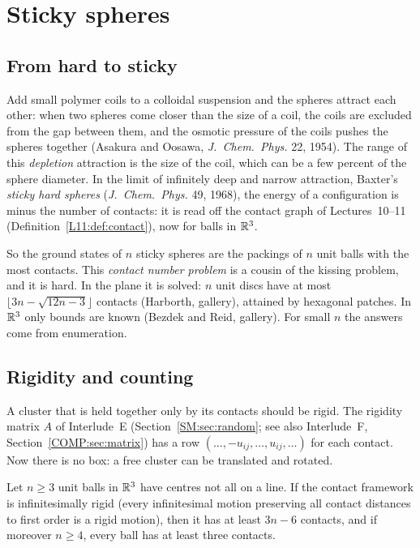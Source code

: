 \section{Sticky spheres}
\label{PHYS:sec:sticky}

\subsection*{From hard to sticky}
Add small polymer coils to a colloidal suspension and the spheres attract each other: when two spheres
come closer than the size of a coil, the coils are excluded from the gap between them, and the osmotic
pressure of the coils pushes the spheres together (Asakura and Oosawa, \emph{J.\ Chem.\ Phys.} 22, 1954).
The range of this \emph{depletion} attraction is the size of the coil, which can be a few percent of the
sphere diameter. In the limit of infinitely deep and narrow attraction, Baxter's \emph{sticky hard spheres}
(\emph{J.\ Chem.\ Phys.} 49, 1968), the energy of a configuration is minus the number of contacts: it is
read off the contact graph of Lectures~10--11 (Definition~\ref{L11:def:contact}), now for balls in $\mathbb{R}^3$.

So the ground states of $n$ sticky spheres are the packings of $n$ unit balls with the most contacts.
This \emph{contact number problem} is a cousin of the kissing problem, and it is hard. In the plane it is
solved: $n$ unit discs have at most $\lfloor3n-\sqrt{12n-3}\rfloor$ contacts (Harborth, gallery), attained by
hexagonal patches. In $\mathbb{R}^3$ only bounds are known (Bezdek and Reid, gallery). For small $n$ the answers
come from enumeration.

\subsection*{Rigidity and counting}
A cluster that is held together only by its contacts should be rigid. The rigidity matrix $A$ of
Interlude~E (Section~\ref{SM:sec:random}; see also Interlude~F, Section~\ref{COMP:sec:matrix}) has a row
$(\dots,-u_{ij},\dots,u_{ij},\dots)$ for each contact. Now there is no box: a free cluster can be
translated and rotated.

\begin{proposition}\label{PHYS:prop:cluster}
Let $n\ge3$ unit balls in $\mathbb{R}^3$ have centres not all on a line. If the contact framework is
infinitesimally rigid (every infinitesimal motion preserving all contact distances to first order is a
rigid motion), then it has at least $3n-6$ contacts, and if moreover $n\ge4$, every ball has at least
three contacts.
\end{proposition}

